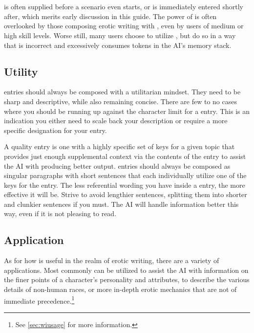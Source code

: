 \documentclass[Coomer-main.tex]{subfiles}
\begin{document}
\chapter{\wi}
\label{ch:wi}

\wi is often supplied before a scenario even starts, or is immediately entered shortly after, which merits early discussion in this guide.
The power of \wi is often overlooked by those composing erotic writing with \aid, even by users of medium or high skill levels.
Worse still, many users choose to utilize \wi, but do so in a way that is incorrect and excessively consumes tokens in the AI’s memory stack.

\section{Utility}
\label{sec:wiutility}

\wi entries should always be composed with a utilitarian mindset.
They need to be sharp and descriptive, while also remaining concise.
There are few to no cases where you should be running up against the character limit for a \wi entry.
This is an indication you either need to scale back your description or require a more specific designation for your entry.

A quality \wi entry is one with a highly specific set of keys for a given topic that provides just enough supplemental context via the contents of the entry to assist the AI with producing better output.
\wi entries should always be composed as singular paragraphs with short sentences that each individually utilize one of the keys for the entry.
The less referential wording you have inside a \wi entry, the more effective it will be.
Strive to avoid lengthier sentences, splitting them into shorter and clunkier sentences if you must.
The AI will handle information better this way, even if it is not pleasing to read.

\section{Application}
\label{sec:wiapplication}

As for how \wi is useful in the realm of erotic writing, there are a variety of applications.
Most commonly \wi can be utilized to assist the AI with information on the finer points of a character’s personality and attributes, to describe the various details of non-human races, or more in-depth erotic mechanics that are not of immediate precedence.\footnote{See \cref{sec:wiusage} for more information.}
\end{document}
